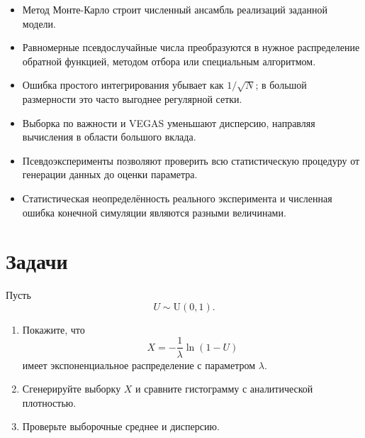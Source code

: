 \documentclass[
  russian,
  11pt,
  a4paper,
  open=any]{scrbook}
\providecommand{\tightlist}{%
  \setlength{\itemsep}{0pt}\setlength{\parskip}{0pt}}
\begin{document}
\begin{bookchaptersummary}

\begin{itemize}
\tightlist
\item
  Метод Монте-Карло строит численный ансамбль реализаций заданной
  модели.
\item
  Равномерные псевдослучайные числа преобразуются в нужное распределение
  обратной функцией, методом отбора или специальным алгоритмом.
\item
  Ошибка простого интегрирования убывает как \(1/\sqrt N\); в большой
  размерности это часто выгоднее регулярной сетки.
\item
  Выборка по важности и VEGAS уменьшают дисперсию, направляя вычисления
  в области большого вклада.
\item
  Псевдоэксперименты позволяют проверить всю статистическую процедуру от
  генерации данных до оценки параметра.
\item
  Статистическая неопределённость реального эксперимента и численная
  ошибка конечной симуляции являются разными величинами.
\end{itemize}

\end{bookchaptersummary}

\section{Задачи}\label{ux437ux430ux434ux430ux447ux438-7}

\begin{semanticpdfbox}[colback=BookCoralSoft,borderline west={1.2mm}{0pt}{BookCoral}]

\par\nopagebreak[4]\vspace{1.2mm}

Пусть \[
U\sim\mathrm U(0,1).
\]

\begin{enumerate}
\def\labelenumi{\arabic{enumi}.}
\tightlist
\item
  Покажите, что \[
  X=-\frac{1}{\lambda}\ln(1-U)
  \] имеет экспоненциальное распределение с параметром \(\lambda\).
\item
  Сгенерируйте выборку \(X\) и сравните гистограмму с аналитической
  плотностью.
\item
  Проверьте выборочные среднее и дисперсию.
\end{enumerate}

\end{semanticpdfbox}
\end{document}
